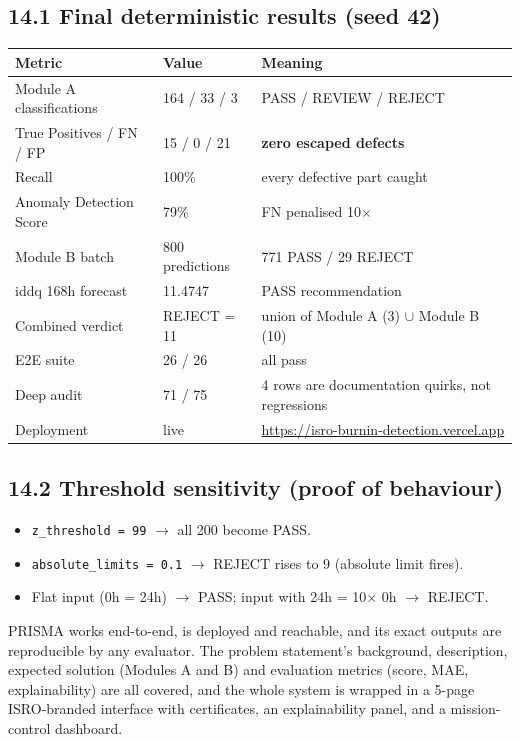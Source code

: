 \documentclass[11pt,a4paper]{article}
\newcommand{\code}[1]{\texttt{\small #1}}
\newcommand{\resultbox}[1]{\par\vspace{0.6em}\noindent
  \begin{tcolorbox}[colback=solgreen!8,colframe=solgreen,
    title={\sffamily\bfseries\color{white}Verified Result},arc=2pt,boxrule=1pt]
    #1
  \end{tcolorbox}\par\vspace{0.4em}}
\begin{document}
\subsection*{14.1 Final deterministic results (seed 42)}
\begin{center}
\begin{tabular}{@{}lll@{}}
\toprule
\textbf{Metric} & \textbf{Value} & \textbf{Meaning}\\
\midrule
Module A classifications & 164 / 33 / 3 & PASS / REVIEW / REJECT\\
True Positives / FN / FP & 15 / 0 / 21 & \textbf{zero escaped defects}\\
Recall & 100\% & every defective part caught\\
Anomaly Detection Score & 79\% & FN penalised 10$\times$\\
Module B batch & 800 predictions & 771 PASS / 29 REJECT\\
iddq 168h forecast & 11.4747 & PASS recommendation\\
Combined verdict & REJECT = 11 & union of Module A (3) $\cup$ Module B (10)\\
E2E suite & 26 / 26 & all pass\\
Deep audit & 71 / 75 & 4 rows are documentation quirks, not regressions\\
Deployment & live & \url{https://isro-burnin-detection.vercel.app}\\
\bottomrule
\end{tabular}
\end{center}

\subsection*{14.2 Threshold sensitivity (proof of behaviour)}
\begin{itemize}[leftmargin=1.5em]
  \item \code{z\_threshold = 99} $\rightarrow$ all 200 become PASS.
  \item \code{absolute\_limits = 0.1} $\rightarrow$ REJECT rises to 9 (absolute limit fires).
  \item Flat input (0h = 24h) $\rightarrow$ PASS; input with 24h = 10$\times$ 0h $\rightarrow$ REJECT.
\end{itemize}

\resultbox{PRISMA works end-to-end, is deployed and reachable, and its exact outputs are
  reproducible by any evaluator. The problem statement's background, description, expected
  solution (Modules A and B) and evaluation metrics (score, MAE, explainability) are all covered,
  and the whole system is wrapped in a 5-page ISRO-branded interface with certificates, an
  explainability panel, and a mission-control dashboard.}
\end{document}
